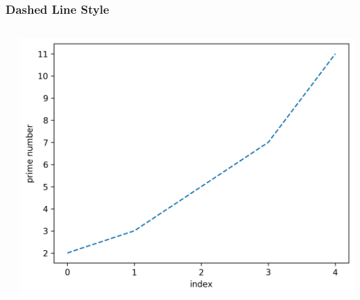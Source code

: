 \documentclass[xcolor={svgnames}]{beamer}
\newcommand{\pyfile}[2][]{}
\begin{document}
\begin{frame}[t,fragile]
    \frametitle{Dashed Line Style}
    \vspace{5mm}
    \begin{columns}[T]
        \begin{column}{0.52\textwidth}
            \pyfile{examples/12-dashed-line-style.py}
        \end{column}
        \begin{column}{0.48\textwidth}
            \includegraphics[width=\textwidth]{img/12-dashed-line-style.png}
        \end{column}
    \end{columns}
\end{frame}
\end{document}
